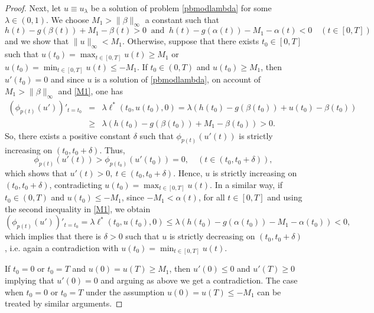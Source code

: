 \documentclass[11pt]{amsart}
\numberwithin{equation}{section} \textwidth=15.5cm
\begin{document}
\begin{proof}
Next, let $u \equiv u_{\lambda}$ be a solution of problem \eqref{pbmodlambda} for some $\lambda\in(0,1)$. We choose $M_1>\|\beta\|_\infty$ a constant such that
\begin{equation}\label{M1}
    h(t)-g(\beta(t))+M_1-\beta(t)>0\ \mbox{ and }\ h(t)-g(\alpha(t))-M_1-\alpha(t)<0 \quad (t\in[0,T])
\end{equation}
and we show that $\|u\|_\infty<M_1$. Otherwise, suppose that there exists $t_0\in[0,T]$ such that $u(t_0)=\max_{t\in[0,T]}u(t)\geq M_1$ or $u(t_0)=\min_{t\in[0,T]}u(t)\leq -M_1$.
If $t_0\in(0,T)$ and $u(t_0)\geq M_1$, then $u'(t_0)=0$ and since $u$ is a solution of \eqref{pbmodlambda}, on account of $M_1>\|\beta\|_\infty$ and \eqref{M1}, one has
\begin{eqnarray*}
  (\phi_{p(t)}(u'))'_{t=t_0} &=& \lambda\ell^*(t_0,u(t_0),0)=\lambda(h(t_0)-g(\beta(t_0))+u(t_0)-\beta(t_0)) \\
  &\geq& \lambda(h(t_0)-g(\beta(t_0))+M_1-\beta(t_0))>0.
\end{eqnarray*}
So, there exists a positive constant $\delta$ such that $\phi_{p(t)}(u'(t))$ is strictly increasing on $(t_0,t_0+\delta)$. Thus, $$\phi_{p(t)}(u'(t))>\phi_{p(t_0)}(u'(t_0))=0,\quad (t\in(t_0,t_0+\delta)),$$ which shows that $u'(t)>0,\ t\in (t_0,t_0+\delta)$. Hence, $u$ is strictly increasing on $(t_0,t_0+\delta)$, contradicting $u(t_0)=\max_{t\in[0,T]}u(t)$. In a similar way, if $t_0\in(0,T)$ and $u(t_0)\leq-M_1$, since $-M_1<\alpha(t)$, for all $t\in[0,T]$ and using the second inequality in \eqref{M1}, we obtain
$$(\phi_{p(t)}(u'))'_{t=t_0} = \lambda\ell^*(t_0,u(t_0),0)\leq\lambda(h(t_0)-g(\alpha(t_0))-M_1-\alpha(t_0))<0,$$
which implies that there is $\delta>0$ such that $u$ is strictly decreasing on $(t_0,t_0+\delta)$, i.e. again a contradiction with $u(t_0)=\min_{t\in[0,T]}u(t)$.

If $t_0=0$ or $t_0=T$ and $u(0)=u(T) \geq M_1$, then $u'(0) \leq 0$ and $u'(T) \geq 0$ implying that $u'(0)=0$ and arguing as above we get a contradiction. The case when $t_0=0$ or $t_0=T$ under the assumption $u(0)=u(T) \leq -M_1$ can be treated by similar arguments.


\end{proof}
\end{document}
